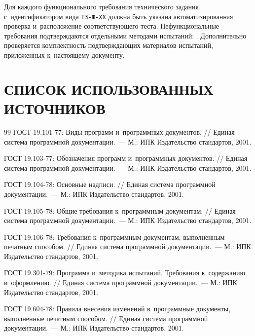 \documentclass[12pt,a4paper]{extarticle}
\begin{document}
\begin{hseExample}
Для каждого функционального требования технического задания с~идентификатором вида \texttt{ТЗ-Ф-XX} должна быть указана автоматизированная проверка и~расположение соответствующего теста. Нефункциональные требования подтверждаются отдельными методами испытаний: . Дополнительно проверяется комплектность подтверждающих материалов испытаний, приложенных к~настоящему документу.
\end{hseExample}

\clearpage
\pagestyle{appendix}

\section*{СПИСОК ИСПОЛЬЗОВАННЫХ ИСТОЧНИКОВ}

\renewcommand{\refname}{}
\begin{thebibliography}{99}
ГОСТ 19.101-77: Виды программ и~программных документов. // Единая система программной документации.~--- М.: ИПК Издательство стандартов, 2001.

ГОСТ 19.103-77: Обозначения программ и~программных документов. // Единая система программной документации.~--- М.: ИПК Издательство стандартов, 2001.

ГОСТ 19.104-78: Основные надписи. // Единая система программной документации.~--- М.: ИПК Издательство стандартов, 2001.

ГОСТ 19.105-78: Общие требования к~программным документам. // Единая система программной документации.~--- М.: ИПК Издательство стандартов, 2001.

ГОСТ 19.106-78: Требования к~программным документам, выполненным печатным способом. // Единая система программной документации.~--- М.: ИПК Издательство стандартов, 2001.

ГОСТ 19.301-79: Программа и~методика испытаний. Требования к~содержанию и~оформлению. // Единая система программной документации.~--- М.: ИПК Издательство стандартов, 2001.

ГОСТ 19.604-78: Правила внесения изменений в~программные документы, выполненные печатным способом. // Единая система программной документации.~--- М.: ИПК Издательство стандартов, 2001.
\end{thebibliography}

\clearpage



\end{document}
